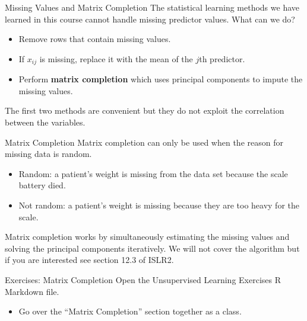 \documentclass[
  ignorenonframetext,
  aspectratio=169,
]{beamer}
\providecommand{\tightlist}{%
  \setlength{\itemsep}{0pt}\setlength{\parskip}{0pt}}\usepackage{longtable,booktabs,array}
\begin{document}
\begin{frame}{Missing Values and Matrix Completion}
\protect\hypertarget{missing-values-and-matrix-completion}{}
The statistical learning methods we have learned in this course cannot
handle missing predictor values. What can we do?

\begin{itemize}
\item
  Remove rows that contain missing values.
\item
  If \(x_{ij}\) is missing, replace it with the mean of the \(j\)th
  predictor.
\item
  Perform \textbf{matrix completion} which uses principal components to
  impute the missing values.
\end{itemize}

The first two methods are convenient but they do not exploit the
correlation between the variables.
\end{frame}

\begin{frame}{Matrix Completion}
\protect\hypertarget{matrix-completion}{}
\alert{Matrix completion can only be used when the reason for missing data is random.}

\begin{itemize}
\item
  Random: a patient's weight is missing from the data set because the
  scale battery died.
\item
  Not random: a patient's weight is missing because they are too heavy
  for the scale.
\end{itemize}

Matrix completion works by
\alert{simultaneously estimating the missing values and solving the principal components}
iteratively. We will not cover the algorithm but if you are interested
see section 12.3 of ISLR2.
\end{frame}

\begin{frame}{Exercises: Matrix Completion}
\protect\hypertarget{exercises-matrix-completion}{}
Open the Unsupervised Learning Exercises R Markdown file.

\begin{itemize}
\tightlist
\item
  Go over the ``Matrix Completion'' section together as a class.
\end{itemize}
\end{frame}
\end{document}
